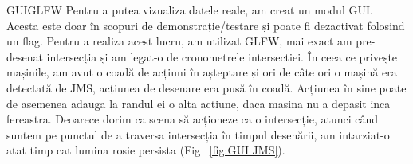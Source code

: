 \documentclass{beamer}
\begin{document}
    \begin{frame}{GUIGLFW}
        Pentru a putea vizualiza datele reale, am creat un modul GUI.
        Acesta este doar în scopuri de demonstrație/testare și poate fi
        dezactivat folosind un flag. Pentru a realiza acest lucru, am
        utilizat GLFW, mai exact am pre-desenat intersecția și am
        legat-o de cronometrele intersectiei. În ceea ce privește
        mașinile, am avut o coadă de acțiuni în așteptare și ori de
        câte ori o mașină era detectată de JMS, acțiunea de desenare era
        pusă în coadă. Acțiunea în sine poate de asemenea adauga la randul 
        ei o alta actiune, daca masina nu a depasit inca fereastra.
        Deoarece dorim ca scena să acționeze ca o intersecție,
        atunci când suntem pe punctul de a traversa intersecția în timpul
        desenării, am intarziat-o atat timp cat lumina rosie persista (Fig ~\ref{fig:GUI JMS}).
        
    \end{frame}
\end{document}
